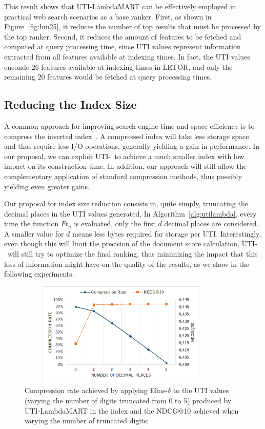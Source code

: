 \documentclass[preprint,review,10pt,3p]{elsarticle}
\begin{document}
This result shows that UTI-LambdaMART can be effectively employed 
in practical web search scenarios as a base ranker.
First, as shown in Figure~\ref{fig:bm25}, it reduces the number of top results that must be processed by the top ranker. 
Second, it reduces the amount of features to be fetched and computed at query processing time, since UTI values represent information extracted from all features available at indexing times. In fact, the UTI values enconde 26 features available at indexing times in LETOR, and only the remaining 20 features would be fetched at query processing times.

\subsection{Reducing the Index Size}
\label{sec:compression}

A common approach for improving search engine time and space efficiency is to compress the inverted index~\cite{baezaribeiro2011modinforet}. A compressed index will take less storage space and thus require less I/O operations, generally yielding a gain in performance. In our proposal, we can exploit UTI-\lambdamart\ to achieve a much smaller index with low impact on its construction time. In addition, our approach will still allow the complementary application of standard compression methods, thus possibly yielding even greater gains.

Our proposal for index size reduction consists in, quite simply, truncating the decimal places in the UTI values generated. In Algorithm~\ref{alg:utilambda}, every time the function $Ft_n$ is evaluated, only the first $d$ decimal places are considered. A smaller value for $d$ means less bytes required for storage per UTI. Interestingly, even though this will limit the precision of the document score calculation, UTI-\lamdamart\ will still try to optimize the final ranking, thus minimizing the impact that this loss of information might have on the quality of the results, as we show in the following experiments.

\begin{figure}[ht!]
\centering
\includegraphics[width=10cm, height=5cm]{im_cr_ndcg_lambda.png}
\caption{Compression rate achieved by applying Elias-$\delta$ to the UTI values (varying the number of digits truncated from 0 to 5) produced by UTI-LambdaMART in the index and the NDCG@10 achieved when varying the number of truncated digits;}
\label{fig:crq}
\end{figure}
\end{document}
